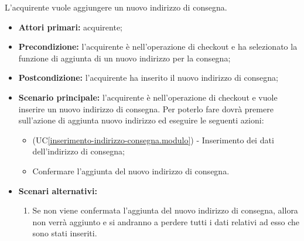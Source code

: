 
\label{inserimento-indirizzo-consegna}

L'acquirente vuole aggiungere un nuovo indirizzo di consegna.
\begin{itemize}
    \item \textbf{Attori primari:} acquirente;
    \item \textbf{Precondizione:} l'acquirente è nell'operazione di checkout e ha selezionato la funzione di aggiunta di un nuovo indirizzo per la consegna;
    \item \textbf{Postcondizione:} l'acquirente ha inserito il nuovo indirizzo di consegna;
    \item \textbf{Scenario principale:} l'acquirente è nell'operazione di checkout e vuole inserire un nuovo indirizzo di consegna. Per poterlo fare dovrà premere sull'azione di aggiunta nuovo indirizzo ed eseguire le seguenti azioni:
    \begin{itemize}
        \item (UC\ref{inserimento-indirizzo-consegna.modulo}) - Inserimento dei dati dell'indirizzo di consegna; 
        \item Confermare l'aggiunta del nuovo indirizzo di consegna.
    \end{itemize}
    \item \textbf{Scenari alternativi:}
    \begin{enumerate}[label=\lett]
        \item Se non viene confermata l'aggiunta del nuovo indirizzo di consegna, allora non verrà aggiunto e si andranno a perdere tutti i dati relativi ad esso che sono stati inseriti.
    \end{enumerate}
\end{itemize}

\label{inserimento-indirizzo-consegna.modulo}

